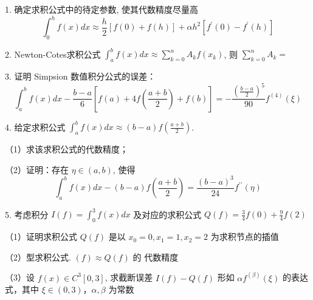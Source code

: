 1. 确定求积公式中的待定参数, 使其代数精度尽量高
$$
\int_{0}^{h} f(x) d x \approx \frac{h}{2}[f(0)+f(h)]+\alpha h^{2}\left[f^{\prime}(0)-f^{\prime}(h)\right]
$$

2. Newton-Cotes求积公式 $\displaystyle \int_{a}^{b} f(x) d x \approx \sum\limits_{k=0}^{n} A_{k} f\left(x_{k}\right) $, 则 $ \sum\limits_{k=0}^{n} A_{k}= $ $ \qquad $

3. 证明 Simpsion 数值积分公式的误差：
$$
\int_{a}^{b} f(x) d x-\frac{b-a}{6}\left[f(a)+4 f\left(\frac{a+b}{2}\right)+f(b)\right]=-\frac{\left(\frac{b-a}{2}\right)^{5}}{90} f^{(4)}(\xi)
$$

4. 给定求积公式 $ \int_{a}^{b} f(x) d x \approx(b-a) f\left(\frac{a+b}{2}\right) $.

（1）求该求积公式的代数精度；

（2）证明：存在 $ \eta \in(a, b) $, 使得
$$
\int_{a}^{b} f(x) d x-(b-a) f\left(\frac{a+b}{2}\right)=\frac{(b-a)^{3}}{24} f^{\prime \prime}(\eta)
$$

5. 考虑积分 $ I(f)=\int_{0}^{3} f(x) d x $ 及对应的求积公式 $ Q(f)=\frac{3}{4} f(0)+\frac{9}{4} f(2) $

（1）证明求积公式 $ Q(f) $ 是以 $ x_{0}=0, x_{1}=1, x_{2}=2 $ 为求积节点的插值

（2）型求积公式. $ (f) \approx Q(f) $ 的 代数精度

（3）设 $ f(x) \in C^{3}[0,3] $, 求截断误差 $ I(f)-Q(f) $ 形如 $ \alpha f^{(\beta)}(\xi) $ 的表达式，其中 $ \xi \in(0,3) ， \alpha, \beta $ 为常数